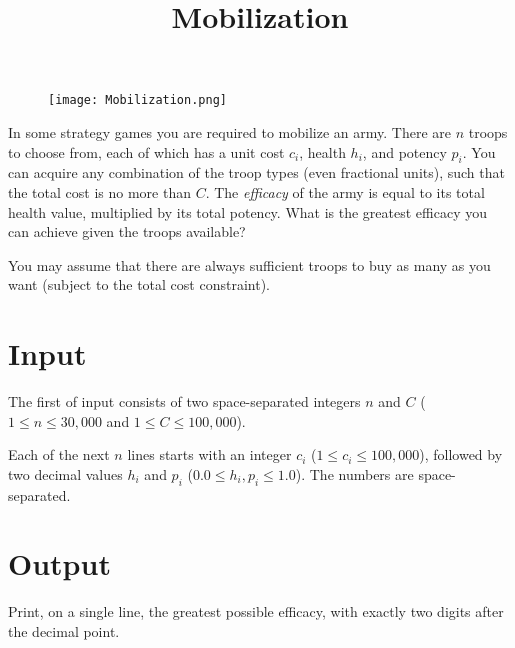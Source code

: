 \documentclass{article}
\title{Mobilization}
\date{}
\begin{document}
\maketitle
\begin{figure}[h!]
\centering
\texttt{[image: Mobilization.png]}
\end{figure}


In some strategy games you are required to mobilize an army.
There are $n$ troops to choose from, each of which has a unit cost $c_i$,
health $h_i$, and potency $p_i$.
You can acquire any combination of the troop types (even fractional units),
such that the total cost is no more than $C$.
The \emph{efficacy} of the army is equal to its
total health value, multiplied by its total potency.  What is the greatest
efficacy you can achieve given the troops available?

You may assume that there are always sufficient troops to buy as many as
you want (subject to the total cost constraint).

\section{Input}

The first of input consists of two space-separated integers $n$ and
$C$ ($1 \le n \le 30{,}000$ and $1 \le C \le 100{,}000$).

Each of the next $n$ lines starts with an integer $c_i$ ($1 \le c_i \le 100{,}000$),
followed by two decimal values $h_i$ and $p_i$ ($0.0 \le h_i, p_i \le 1.0$).
The numbers are space-separated.

\section{Output}

Print, on a single line, the greatest possible efficacy, with exactly two digits
after the decimal point.

\end{document}
